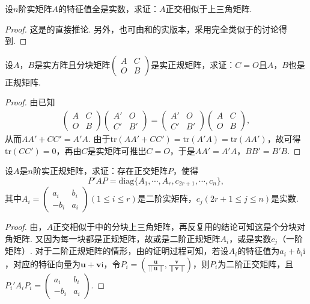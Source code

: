 \documentclass[../../main.tex]{subfiles}
\begin{document}
\begin{proposition}\label{proposition:例9.88}
设\(n\)阶实矩阵\(A\)的特征值全是实数，求证：\(A\)正交相似于上三角矩阵.
\end{proposition}
\begin{proof}
这是的直接推论. 另外，也可由和的实版本，采用完全类似于的讨论得到.
\end{proof}

\begin{proposition}\label{proposition:例9.89}
设\(A\)，\(B\)是实方阵且分块矩阵\(\begin{pmatrix}A&C\\O&B\end{pmatrix}\)是实正规矩阵，求证：\(C = O\)且\(A\)，\(B\)也是正规矩阵.
\end{proposition}
\begin{proof}
由已知
\begin{align*}
\begin{pmatrix}A&C\\O&B\end{pmatrix}\begin{pmatrix}A'&O\\C'&B'\end{pmatrix}=\begin{pmatrix}A'&O\\C'&B'\end{pmatrix}\begin{pmatrix}A&C\\O&B\end{pmatrix},
\end{align*}
从而\(AA'+CC' = A'A\). 由于\(\mathrm{tr}(AA'+CC')=\mathrm{tr}(A'A)=\mathrm{tr}(AA')\)，故可得\(\mathrm{tr}(CC') = 0\)，再由\(C\)是实矩阵可推出\(C = O\)，于是\(AA' = A'A\)，\(BB' = B'B\).
\end{proof}

\begin{proposition}\label{proposition:例9.90}
设\(A\)是\(n\)阶实正规矩阵，求证：存在正交矩阵\(P\)，使得
\[
P'AP = \mathrm{diag}\{A_1,\cdots,A_r,c_{2r + 1},\cdots,c_n\},
\]
其中\(A_i=\begin{pmatrix}a_i&b_i\\-b_i&a_i\end{pmatrix}(1\leq i\leq r)\)是二阶实矩阵，\(c_j(2r + 1\leq j\leq n)\)是实数.
\end{proposition}
\begin{proof}
由，\(A\)正交相似于中的分块上三角矩阵，再反复用的结论可知这是个分块对角矩阵. 又因为每一块都是正规矩阵，故或是二阶正规矩阵\(A_i\)，或是实数\(c_j\)（一阶矩阵）. 对于二阶正规矩阵的情形，由的证明过程可知，若设\(A_i\)的特征值为\(a_i + b_i\mathrm{i}\)，对应的特征向量为\(\boldsymbol{u}+ \boldsymbol{v}\mathrm{i}\)，令\(P_i = (\frac{\boldsymbol{u}}{\|\boldsymbol{u}\|},\frac{\boldsymbol{v}}{\|\boldsymbol{v}\|})\)，则\(P_i\)为二阶正交矩阵，且\(P_i'A_iP_i=\begin{pmatrix}a_i&b_i\\-b_i&a_i\end{pmatrix}\). 
\end{proof}
\end{document}
